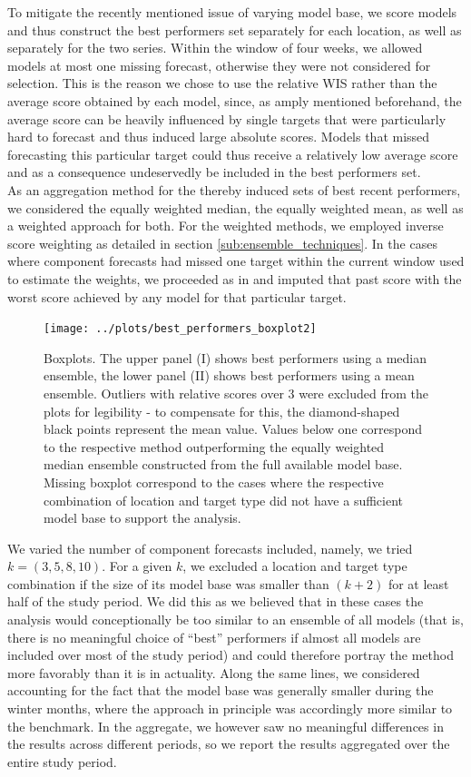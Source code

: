 To mitigate the recently mentioned issue of varying model base, we score models and thus construct the best performers set separately for each location, as well as separately for the two series. Within the window of four weeks, we allowed models at most one missing forecast, otherwise they were not considered for selection. This is the reason we chose to use the relative WIS rather than the average score obtained by each model, since, as amply mentioned beforehand, the average score can be heavily influenced by single targets that were particularly hard to forecast and thus induced large absolute scores. Models that missed forecasting this particular target could thus receive a relatively low average score and as a consequence undeservedly be included in the best performers set.\\
As an aggregation method for the thereby induced sets of best recent performers, we considered the equally weighted median, the equally weighted mean, as well as a weighted approach for both. For the weighted methods, we employed inverse score weighting as detailed in section \ref{sub:ensemble_techniques}. In the cases where component forecasts had missed one target within the current window used to estimate the weights, we proceeded as in \cite{bracher_evaluating_2021} and imputed that past score with the worst score achieved by any model for that particular target.\\
\begin{figure}
\centering
\texttt{[image: ../plots/best\_performers\_boxplot2]}
\caption{Boxplots. The upper panel (I) shows best performers using a median ensemble, the lower panel (II) shows best performers using a mean ensemble. Outliers with relative scores over 3 were excluded from the plots for legibility - to compensate for this, the diamond-shaped black points represent the mean value. Values below one correspond to the respective method outperforming the equally weighted median ensemble constructed from the full available model base. Missing boxplot correspond to the cases where the respective combination of location and target type did not have a sufficient model base to support the analysis.}
\label{ref:best_perform_boxplot}
\end{figure}
We varied the number of component forecasts included, namely, we tried $k = (3,5,8,10)$. For a given $k$, we excluded a location and target type combination if the size of its model base was smaller than $(k+2)$ for at least half of the study period. We did this as we believed that in these cases the analysis would conceptionally be too similar to an ensemble of all models (that is, there is no meaningful choice of ``best'' performers if almost all models are included over most of the study period) and could therefore portray the method more favorably than it is in actuality. Along the same lines, we considered accounting for the fact that the model base was generally smaller during the winter months, where the approach in principle was accordingly more similar to the benchmark. In the aggregate, we however saw no meaningful differences in the results across different periods, so we report the results aggregated over the entire study period.\\
